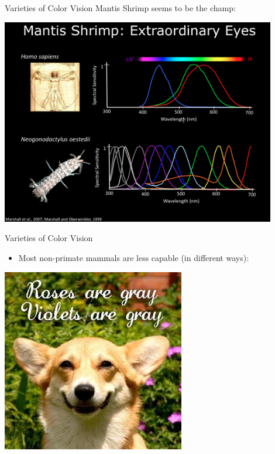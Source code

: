 \documentclass{beamer}
\begin{document}
\begin{frame}{Varieties of Color Vision}
Mantis Shrimp seems to be the champ:
   \begin{center}
      \includegraphics[width=0.9\textwidth]{figures/mantisshrimp.jpg}
   \end{center}
\end{frame}

\begin{frame}{Varieties of Color Vision}
   \begin{itemize}
      \item Most non-primate mammals are less capable (in different ways):
   \end{itemize}
   \begin{center}
      \includegraphics[width=0.6\textwidth]{figures/redroses.jpg}
   \end{center}
\end{frame}
\end{document}
